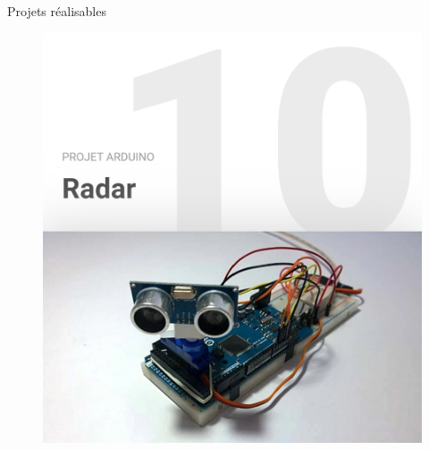 \documentclass[]{beamer}
\begin{document}
	\begin{frame}
	{Projets réalisables}
			\begin{figure}
				\begin{center}
					\includegraphics[scale=0.4]{radar.png}
				\end{center}
			\end{figure}
	\end{frame}
\end{document}
